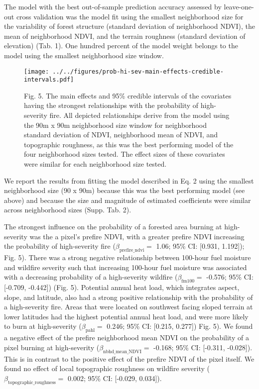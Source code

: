 \documentclass[]{article}
\begin{document}
The model with the best out-of-sample prediction accuracy assessed by
leave-one-out cross validation was the model fit using the smallest
neighborhood size for the variability of forest structure (standard
deviation of neighborhood NDVI), the mean of neighborhood NDVI, and the
terrain roughness (standard deviation of elevation) (Tab. 1). One
hundred percent of the model weight belongs to the model using the
smallest neighborhood size window.

\begin{figure}
\centering
\texttt{[image: ../../figures/prob-hi-sev-main-effects-credible-intervals.pdf]}
\caption{Fig. 5. The main effects and 95\% credible intervals of the
covariates having the strongest relationships with the probability of
high-severity fire. All depicted relationships derive from the model
using the 90m x 90m neighborhood size window for neighborhood standard
deviation of NDVI, neighborhood mean of NDVI, and topographic roughness,
as this was the best performing model of the four neighborhood sizes
tested. The effect sizes of these covariates were similar for each
neighborhood size tested.}
\end{figure}

We report the results from fitting the model described in Eq. 2 using
the smallest neighborhood size (90 x 90m) because this was the best
performing model (see above) and because the size and magnitude of
estimated coefficients were similar across neighborhood sizes (Supp.
Tab. 2).

The strongest influence on the probability of a forested area burning at
high-severity was the a pixel's prefire NDVI, with a greater prefire
NDVI increasing the probability of high-severity fire
(\(\beta_{\text{prefire\_ndvi}}=\) 1.06; 95\% CI: {[}0.931, 1.192{]});
Fig. 5). There was a strong negative relationship between 100-hour fuel
moisture and wildfire severity such that increasing 100-hour fuel
moisture was associated with a decreasing probability of a high-severity
wildfire (\(\beta_{\text{fm100}}=\) -0.576; 95\% CI: {[}-0.709,
-0.442{]}) (Fig. 5). Potential annual heat load, which integrates
aspect, slope, and latitude, also had a strong positive relationship
with the probability of a high-severity fire. Areas that were located on
southwest facing sloped terrain at lower latitudes had the highest
potential annual heat load, and were more likely to burn at
high-severity (\(\beta_{\text{pahl}}=\) 0.246; 95\% CI: {[}0.215,
0.277{]}) Fig. 5). We found a negative effect of the prefire
neighborhood mean NDVI on the probability of a pixel burning at
high-severity (\(\beta_{\text{nbhd\_mean\_NDVI}}=\) -0.168; 95\% CI:
{[}-0.311, -0.028{]}). This is in contrast to the positive effect of the
prefire NDVI of the pixel itself. We found no effect of local
topographic roughness on wildfire severity
(\(\beta_{\text{topographic\_roughness}}=\) 0.002; 95\% CI: {[}-0.029,
0.034{]}).
\end{document}
